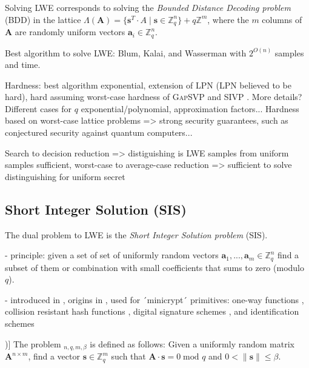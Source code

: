 \documentclass[
  a4paper,  %
  twoside,  %
  bibliography=totoc,
  headsepline,
  cleardoublepage=empty,
  parskip=half,
  draft=false
]{scrbook}
\begin{document}



Solving LWE corresponds to solving the \textit{Bounded Distance Decoding problem} (BDD) in the lattice $\Lambda(\textbf{A}) = \{ \textbf{s}^{T} \cdot A \mid \textbf{s} \in \mathbb{Z}_q^n\} + q \mathbb{Z}^m$, where the $m$ columns of $\textbf{A}$ are randomly uniform vectors $\textbf{a}_i \in \mathbb{Z}_q^n$. %

Best algorithm to solve LWE: Blum, Kalai, and Wasserman \cite{BKW03} with $2^{O(n)}$ samples and time. %

Hardness: best algorithm exponential, extension of LPN (LPN believed to be hard), hard assuming worst-case hardness of \textsc{GapSVP} %
and \textsc{SIVP} \cite{Reg05, Pei09}. More details? Different cases for $q$ exponential/polynomial, approximation factors...
Hardness based on worst-case lattice problems => strong security guarantees, such as conjectured security against quantum computers...
 
Search to decision reduction => distiguishing is LWE samples from uniform samples sufficient, worst-case to average-case reduction => sufficient to solve distinguishing for uniform secret

\subsection{Short Integer Solution (SIS)}
The dual problem to LWE is the \textit{Short Integer Solution problem} (SIS).

- principle: given a set of set of uniformly random vectors $\textbf{a}_1, ..., \textbf{a}_m \in \mathbb{Z}_q^n$ find a subset of them or combination with small coefficients that sums to zero (modulo $q$). %

- introduced in \cite{MR04}, origins in \cite{Atj96}, used for ´minicrypt´ primitives: one-way functions \cite{Atj96}, collision resistant hash functions \cite{GGH96}, digital signature schemes \cite{GPV08, CHKP10}, and identification schemes \cite{MV03, Lyu08, KTX07} %

\begin{definition}[SIS Problem (Adapted from [\citealp{LS15}, Definition 3.1])]
  The problem $_{n, q, m, \beta}$ is defined as follows: Given a uniformly random matrix $\textbf{A}^{n\times m}$, find a vector $\textbf{s} \in \mathbb{Z}_q^m$ such that $\textbf{A} \cdot \textbf{s} = 0 \; \text{mod } q$ and $0 < \| \textbf{s}\| \leq \beta$.
\end{definition}
\end{document}
